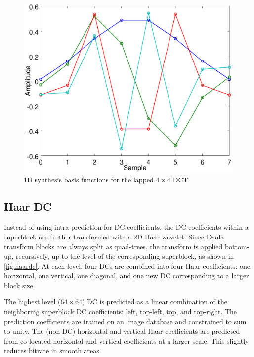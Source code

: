 \documentclass[english,conference,10pt]{IEEEtran}
\begin{document}
\begin{figure}
\centering
\includegraphics[width=0.8\columnwidth]{basis4}
\caption{1D synthesis basis functions for the lapped $4 \times 4$ DCT.\label{fig:basis4}}
\end{figure}

\subsection{Haar DC}
\label{sec:HaarDC}

Instead of using intra prediction for DC coefficients, the DC coefficients
within a superblock are further transformed with a 2D Haar wavelet.
Since Daala transform blocks are always split as quad-trees, the transform is
applied bottom-up, recursively, up to the level of the corresponding superblock,
as shown in \cref{fig:haardc}.
At each level, four DCs are combined into four Haar coefficients: one horizontal,
one vertical, one diagonal, and one new DC corresponding to a larger block size.

The highest level ($64\times 64$) DC is predicted as a linear combination of the
neighboring superblock DC coefficients: left, top-left, top, and top-right.
The prediction coefficients are trained on an image database and constrained to
sum to unity. The
(non-DC) horizontal and vertical Haar coefficients are predicted from
co-located horizontal and vertical coefficients at a larger scale. This slightly
reduces bitrate in smooth areas.
\end{document}
